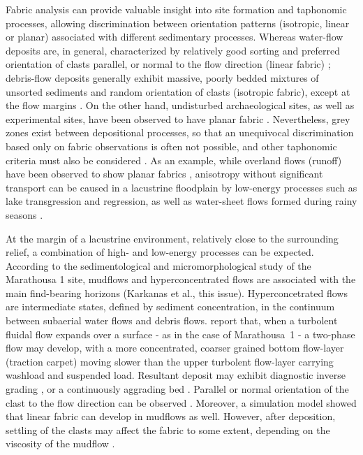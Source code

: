 \documentclass[preprint,authoryear,times]{elsarticle} %
\begin{document}
Fabric analysis can provide valuable insight into site formation and taphonomic processes, allowing discrimination between orientation patterns (isotropic, linear or planar) associated with different sedimentary processes. Whereas water-flow deposits are, in general, characterized by relatively good sorting and preferred orientation of clasts parallel, or normal to the flow direction (linear fabric) \citep{Petraglia1994}; debris-flow deposits generally exhibit massive, poorly bedded mixtures of unsorted sediments and random orientation of clasts (isotropic fabric), except at the flow margins \citep{Pierson2005}. On the other hand, undisturbed archaeological sites, as well as experimental sites, have been observed to have planar fabric \citep{Bertran1997,Lenoble2004}. Nevertheless, grey zones exist between depositional processes, so that an unequivocal discrimination based only on fabric observations is often not possible, and other taphonomic criteria must also be considered \citep{Lenoble2004}. As an example, while overland flows (runoff) have been observed to show planar fabrics \citep{Lenoble2004}, anisotropy without significant transport can be caused in a lacustrine floodplain by low-energy processes such as lake transgression and regression, as well as water-sheet flows formed during rainy seasons \citep{Cobo-Sanchez2014}.

At the margin of a lacustrine environment, relatively close to the surrounding relief, a combination of high- and low-energy processes can be expected. According to the sedimentological and micromorphological study of the Marathousa 1 site, mudflows and hyperconcentrated flows are associated with the main find-bearing horizons (Karkanas et al., this issue). Hyperconcetrated flows are intermediate states, defined by sediment concentration, in the continuum between subaerial water flows and debris flows. \cite{Benvenuti2002} report that, when a turbolent fluidal flow expands over a surface - as in the case of Marathousa~1 - a two-phase flow may develop, with a more concentrated, coarser grained bottom flow-layer (traction carpet) moving slower than the upper turbolent flow-layer carrying washload and suspended load. Resultant deposit may exhibit diagnostic inverse grading \citep{Lowe1982}, or a continuously aggrading bed \citep{Sohn1997}. Parallel or normal orientation of the clast to the flow direction can be observed \citep{Benvenuti2002}. Moreover, a simulation model showed that linear fabric can develop in mudflows as well. However, after deposition, settling of the clasts may affect the fabric to some extent, depending on the viscosity of the mudflow \citep{Lindsay1968}.
 
\end{document}
